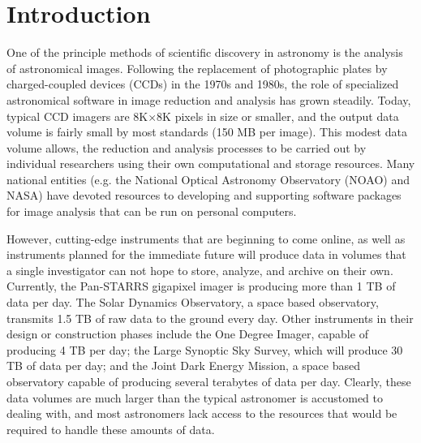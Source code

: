 \documentclass[10pt,conference]{IEEEtran}
\begin{document}
%
\IEEEpeerreviewmaketitle

\section{Introduction}\label{sec:intro}

One of the principle methods of scientific discovery in astronomy is the analysis of astronomical images. Following the replacement of photographic plates by charged-coupled devices (CCDs) in the 1970s and 1980s, the role of specialized astronomical software in image reduction and analysis has grown steadily. Today, typical CCD imagers are 8K$\times$8K pixels in size or smaller, and the output data volume is fairly small by most standards (150 MB per image). This modest data volume allows, the reduction and analysis processes to be carried out by individual researchers using their own computational and storage resources. Many national entities (e.g. the National Optical Astronomy Observatory (NOAO) and NASA) have devoted resources to developing and supporting software packages for image analysis that can be run on personal computers.  

However, cutting-edge instruments that are beginning to come online, as well as instruments planned for the immediate future will produce data in volumes that a single investigator can not hope to store, analyze, and archive on their own. Currently, the Pan-STARRS gigapixel imager is producing more than 1 TB of data per day. The Solar Dynamics Observatory, a space based observatory, transmits 1.5 TB of raw data to the ground every day. Other instruments in their design or construction phases include the One Degree Imager, capable of producing 4 TB per day; the Large Synoptic Sky Survey, which will produce 30 TB of data per day; and the Joint Dark Energy Mission, a space based observatory capable of producing several terabytes of data per day. Clearly, these data volumes are much larger than the typical astronomer is accustomed to dealing with, and most astronomers lack access to the resources that would be required to handle these amounts of data.
\end{document}
